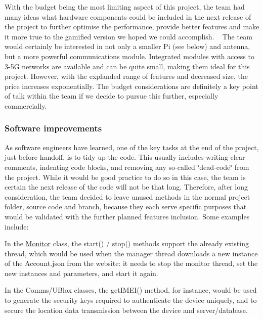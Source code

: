 With the budget being the most limiting aspect of this project, the team had many ideas what hardware components could be included in the next release of the project to further optimise the performance, provide better features and make it more true to the gamified version we hoped we could accomplish. ~\newline
 The team would certainly be interested in not only a smaller Pi (see below) and antenna, but a more powerful communications module. Integrated modules with access to 3-\/5G networks are available and can be quite small, making them ideal for this project. However, with the explanded range of features and decreased size, the price increases exponentially. The budget considerations are definitely a key point of talk within the team if we decide to pursue this further, especially commercially.

\subsubsection*{Software improvements}

As software engineers have learned, one of the key tasks at the end of the project, just before handoff, is to tidy up the code. This usually includes writing clear comments, indenting code blocks, and removing any so-\/called \char`\"{}dead-\/code\char`\"{} from the project. While it would be good practice to do so in this case, the team is certain the next release of the code will not be that long. Therefore, after long consideration, the team decided to leave unused methods in the normal project folder, source code and branch, because they each serve specific purposes that would be validated with the further planned features inclusion. Some examples include\+:
\begin{DoxyItemize}
\item In the \hyperlink{class_monitor}{Monitor} class, the {\ttfamily start()} / {\ttfamily stop()} methods support the already existing thread, which would be used when the manager thread downloads a new instance of the Account.\+json from the website\+: it needs to stop the monitor thread, set the new instances and parameters, and start it again.
\item In the Comms/\+U\+Blox classes, the {\ttfamily get\+I\+M\+E\+I()} method, for instance, would be used to generate the security keys required to authenticate the device uniquely, and to secure the location data transmission between the device and server/database.
\end{DoxyItemize}

